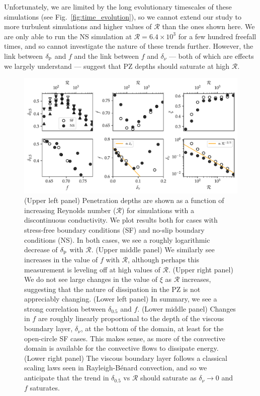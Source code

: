 \documentclass[twocolumn]{aastex631}
\newcommand{\delp}{\ensuremath{\delta_{\rm{p}}}}
\newcommand{\mR}{\ensuremath{\mathcal{R}}}
\begin{document}
Unfortunately, we are limited by the long evolutionary timescales of these simulations (see Fig.~\ref{fig:time_evolution}), so we cannot extend our study to more turbulent simulations and higher values of $\mR$ than the ones shown here.
We are only able to run the NS simulation at $\mR = 6.4 \times 10^3$ for a few hundred freefall times, and so cannot investigate the nature of these trends further.
However, the link between $\delp$ and $f$ and the link between $f$ and $\delta_\nu$ --- both of which are effects we largely understand --- suggest that PZ depths should saturate at high $\mR$.


\begin{figure}[t!]
\centering
\includegraphics{parameters_vs_re.pdf}
\caption{
(Upper left panel) Penetration depths are shown as a function of increasing Reynolds number ($\mR$) for simulations with a discontinuous conductivity.
We plot results both for cases with stress-free boundary conditions (SF) and no-slip boundary conditions (NS).
In both cases, we see a roughly logarithmic decrease of $\delp$ with $\mR$.
(Upper middle panel) We similarly see increases in the value of $f$ with $\mR$, although perhaps this measurement is leveling off at high values of $\mR$.
(Upper right panel) We do not see large changes in the value of $\xi$ as $\mR$ increases, suggesting that the nature of dissipation in the PZ is not appreciably changing.
(Lower left panel) In summary, we see a strong correlation between $\delta_{0.5}$ and $f$.
(Lower middle panel) Changes in $f$ are roughly linearly proportional to the depth of the viscous boundary layer, $\delta_\nu$, at the bottom of the domain, at least for the open-circle SF cases.
This makes sense, as more of the convective domain is available for the convective flows to dissipate energy.
(Lower right panel) The viscous boundary layer follows a classical scaling laws seen in Rayleigh-B\'{e}nard convection, and so we anticipate that the trend in $\delta_{0.5}$ vs $\mR$ should saturate as $\delta_{\nu} \rightarrow 0$ and $f$ saturates.
\label{fig:parameters_vs_re}
}
\end{figure}
\end{document}
